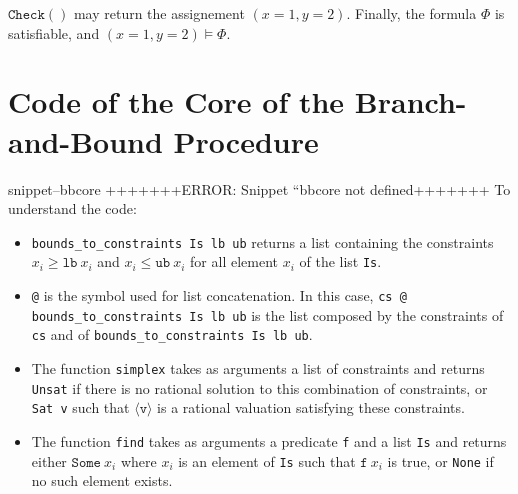 \documentclass{article}
\newcommand{\icheck}{\mathtt{Check}()}
\newcommand{\Snippet}[1]{%
  \ifcsname snippet--#1\endcsname{\csname snippet--#1\endcsname}%
  \else+++++++ERROR: Snippet ``#1 not defined+++++++ \fi}
\begin{document}
$\icheck$ may return the assignement $(x=1, y=2)$. Finally, the formula $\Phi$
is satisfiable, and $(x=1, y=2) \vDash \Phi$.

\section{Code of the Core of the Branch-and-Bound Procedure}
\label{bbcode}

\Snippet{bbcore}
To understand the code:
\begin{itemize}
  \item \texttt{bounds\_to\_constraints Is lb ub} returns a list containing the
    constraints $x_i \geqslant \mathtt{lb}~x_i$ and
    $x_i \leqslant \mathtt{ub}~x_i$ for all element $x_i$ of the list
    \texttt{Is}.
  \item \texttt{@} is the symbol used for list concatenation. In this case,
    \linebreak \texttt{cs @ bounds\_to\_constraints Is lb ub} is the list
    composed by the constraints of \texttt{cs} and of
    \texttt{bounds\_to\_constraints~Is~lb~ub}.
  \item The function \texttt{simplex} takes as arguments a list of
    constraints and returns \texttt{Unsat} if there is no rational solution to
    this combination of constraints, or \texttt{Sat v} such that
    $\langle \mathtt{v} \rangle$ is a rational valuation satisfying these
    constraints.
  \item The function \texttt{find} takes as arguments a predicate \texttt{f}
    and a list \texttt{Is} and returns either $\mathtt{Some}~x_i$ where $x_i$ is
    an element of \texttt{Is} such that $\mathtt{f}~x_i$ is true, or
    \texttt{None} if no such element exists.
\end{itemize}
\end{document}
